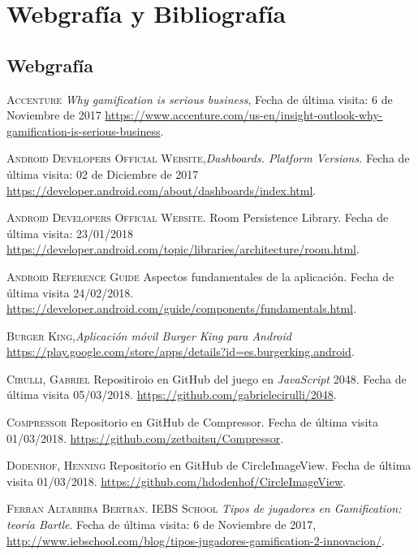 \documentclass[twoside]{report}
\begin{document}
\chapter{Webgrafía y Bibliografía}

\begin{thebibliography}{a} 
\section{Webgrafía}

 \textsc{Accenture} \textit{Why gamification is serious business}, Fecha de última visita: 6 de Noviembre de 2017 \url{https://www.accenture.com/us-en/insight-outlook-why-gamification-is-serious-business}.  

 \textsc{Android Developers Official Website},\textit{Dashboards. Platform Versions.} Fecha de última visita: 02 de Diciembre de 2017 \url{https://developer.android.com/about/dashboards/index.html}.

 \textsc{Android Developers Official Website}. Room Persistence Library. Fecha de última visita: 23/01/2018 \url{https://developer.android.com/topic/libraries/architecture/room.html}.

 \textsc{Android Reference Guide} Aspectos fundamentales de la aplicación. Fecha de última visita 24/02/2018. \url{https://developer.android.com/guide/components/fundamentals.html}.

 \textsc{Burger King},\textit{Aplicación móvil Burger King para Android} \url{https://play.google.com/store/apps/details?id=es.burgerking.android}.

 \textsc{Cirulli, Gabriel} 
Repositiroio en GitHub del juego en \textit{JavaScript} 2048. Fecha de última visita 05/03/2018. \url{https://github.com/gabrielecirulli/2048}.

 \textsc{Compressor} 
Repositorio en GitHub de Compressor. Fecha de última visita 01/03/2018. \url{https://github.com/zetbaitsu/Compressor}.

 \textsc{Dodenhof, Henning} 
Repositorio en GitHub de CircleImageView. Fecha de última visita 01/03/2018. \url{https://github.com/hdodenhof/CircleImageView}.

 \textsc{Ferran Altarriba Bertran. IEBS School} \textit{Tipos de jugadores en Gamification: teoría Bartle}. Fecha de última visita: 6 de Noviembre de 2017, \url{http://www.iebschool.com/blog/tipos-jugadores-gamification-2-innovacion/}.  


\end{thebibliography}
\end{document}
